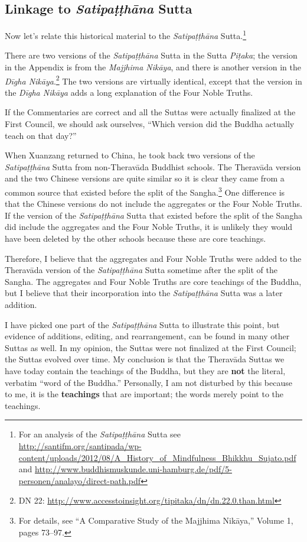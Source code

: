 \subsection*{Linkage to \textit{Satipaṭṭhāna} Sutta}
Now let’s relate this historical material to the \textit{Satipaṭṭhāna} Sutta.\footnote{For an analysis of the \textit{Satipaṭṭhāna} Sutta see \url{http://santifm.org/santipada/wp-content/uploads/2012/08/A_History_of_Mindfulness_Bhikkhu_Sujato.pdf} and \url{http://www.buddhismuskunde.uni-hamburg.de/pdf/5-personen/analayo/direct-path.pdf}}

There are two versions of the \textit{Satipaṭṭhāna} Sutta in the Sutta \textit{Piṭaka}; the version in the Appendix is from the \textit{Majjhima Nikāya}, and there is another version in the \textit{Dīgha Nikāya}.\footnote{DN 22: \url{http://www.accesstoinsight.org/tipitaka/dn/dn.22.0.than.html}} The two versions are virtually identical, except that the version in the \textit{Dīgha Nikāya} adds a long explanation of the Four Noble Truths. 

If the Commentaries are correct and all the Suttas were actually finalized at the First Council, we should ask ourselves, “Which version did the Buddha actually teach on that day?”

When Xuanzang returned to China, he took back two versions of the \textit{Satipaṭṭhāna} Sutta from non-Theravāda Buddhist schools. The Theravāda version and the two Chinese versions are quite similar so it is clear they came from a common source that existed before the split of the Sangha.\footnote{For details, see “A Comparative Study of the Majjhima Nikāya,” Volume 1, pages 73--97.} One difference is that the Chinese versions do not include the aggregates or the Four Noble Truths. If the version of the \textit{Satipaṭṭhāna} Sutta that existed before the split of the Sangha did include the aggregates and the Four Noble Truths, it is unlikely they would have been deleted by the other schools because these are core teachings. 

Therefore, I believe that the aggregates and Four Noble Truths were added to the Theravāda version of the \textit{Satipaṭṭhāna} Sutta sometime after the split of the Sangha. The aggregates and Four Noble Truths are core teachings of the Buddha, but I believe that their incorporation into the \textit{Satipaṭṭhāna} Sutta was a later addition.

I have picked one part of the \textit{Satipaṭṭhāna} Sutta to illustrate this point, but evidence of additions, editing, and rearrangement, can be found in many other Suttas as well. In my opinion, the Suttas were not finalized at the First Council; the Suttas evolved over time. My conclusion is that the Theravāda Suttas we have today contain the teachings of the Buddha, but they are \textbf{not} the literal, verbatim “word of the Buddha.” Personally, I am not disturbed by this because to me, it is the \textbf{teachings} that are important; the words merely point to the teachings.

